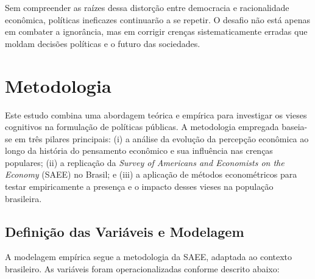 Sem compreender as raízes dessa distorção entre democracia e racionalidade econômica, políticas ineficazes continuarão a se repetir. O desafio não está apenas em combater a ignorância, mas em corrigir crenças sistematicamente erradas que moldam decisões políticas e o futuro das sociedades.


\section{Metodologia} %

Este estudo combina uma abordagem teórica e empírica para investigar os vieses cognitivos na formulação de políticas públicas. A metodologia empregada baseia-se em três pilares principais: 
(i) a análise da evolução da percepção econômica ao longo da história do pensamento econômico e sua influência nas crenças populares; 
(ii) a replicação da \textit{Survey of Americans and Economists on the Economy} (SAEE) no Brasil; e 
(iii) a aplicação de métodos econométricos para testar empiricamente a presença e o impacto desses vieses na população brasileira.

\subsection{Definição das Variáveis e Modelagem} %

A modelagem empírica segue a metodologia da SAEE, adaptada ao contexto brasileiro. As variáveis foram operacionalizadas conforme descrito abaixo:

\renewcommand{\arraystretch}{1.3}


